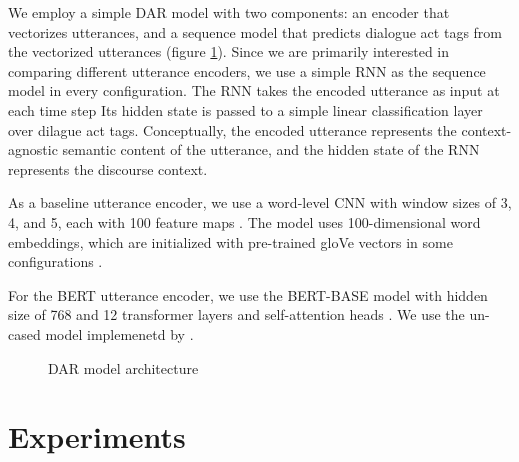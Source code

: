 \documentclass[11pt,a4paper]{article}
\begin{document}
We employ a simple DAR model with two components: an encoder that vectorizes utterances, and a sequence model that predicts dialogue act tags from the vectorized utterances (figure \ref{fig:model-architecture}).
Since we are primarily interested in comparing different utterance encoders, we use a simple RNN as the sequence model in every configuration. 
The RNN takes the encoded utterance as input at each time step
Its hidden state is passed to a simple linear classification layer over dilague act tags.
Conceptually, the encoded utterance represents the context-agnostic semantic content of the utterance, and the hidden state of the RNN represents the discourse context.

As a baseline utterance encoder, we use a word-level CNN with window sizes of 3, 4, and 5, each with 100 feature maps \citep{kimConvolutionalNeuralNetworks2014}. 
The model uses 100-dimensional word embeddings, which are initialized with pre-trained gloVe vectors in some configurations \citep{penningtonGloveGlobalVectors2014}.

For the BERT utterance encoder, we use the BERT-BASE model with hidden size of 768 and 12 transformer layers and self-attention heads \citep[][see \S3.1]{devlinBERTPretrainingDeep2018}.
We use the un-cased model implemenetd by \citet{wolfHuggingFaceTransformersStateoftheart2019}.

\begin{figure}
  
  \caption{DAR model architecture}
  \label{fig:model-architecture}
\end{figure}

\section{Experiments}
\end{document}
